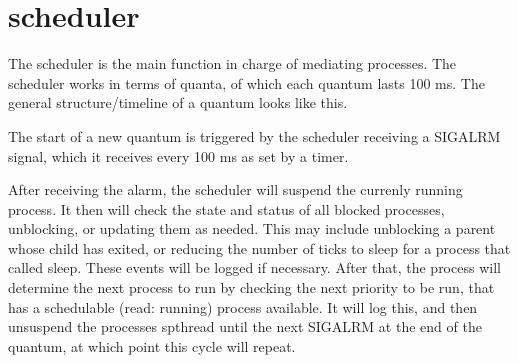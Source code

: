 \chapter{scheduler}
\hypertarget{md_doc_2scheduler}{}\label{md_doc_2scheduler}
The scheduler is the main function in charge of mediating processes. The scheduler works in terms of quanta, of which each quantum lasts 100 ms. The general structure/timeline of a quantum looks like this.

The start of a new quantum is triggered by the scheduler receiving a SIGALRM signal, which it receives every 100 ms as set by a timer.

After receiving the alarm, the scheduler will suspend the currenly running process. It then will check the state and status of all blocked processes, unblocking, or updating them as needed. This may include unblocking a parent whose child has exited, or reducing the number of ticks to sleep for a process that called sleep. These events will be logged if necessary. After that, the process will determine the next process to run by checking the next priority to be run, that has a schedulable (read\+: running) process available. It will log this, and then unsuspend the processes spthread until the next SIGALRM at the end of the quantum, at which point this cycle will repeat. 